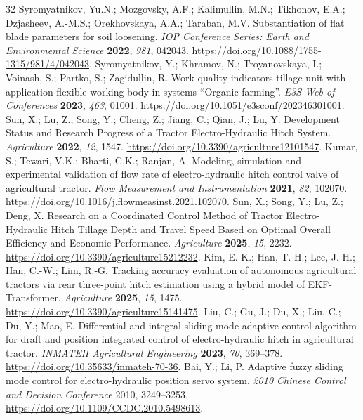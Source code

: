 \documentclass[machines,article,submit,pdftex,moreauthors]{Definitions/mdpi}
\begin{document}
\begin{thebibliography}{32}
 Syromyatnikov, Yu.N.; Mozgovsky, A.F.; Kalimullin, M.N.; Tikhonov, E.A.; Dzjasheev, A.-M.S.; Orekhovskaya, A.A.; Taraban, M.V. Substantiation of flat blade parameters for soil loosening. \emph{IOP Conference Series: Earth and Environmental Science} \textbf{2022}, \emph{981}, 042043. \url{https://doi.org/10.1088/1755-1315/981/4/042043}.
 Syromyatnikov, Y.; Khramov, N.; Troyanovskaya, I.; Voinash, S.; Partko, S.; Zagidullin, R. Work quality indicators tillage unit with application flexible working body in systems ``Organic farming''. \emph{E3S Web of Conferences} \textbf{2023}, \emph{463}, 01001. \url{https://doi.org/10.1051/e3sconf/202346301001}.
 Sun, X.; Lu, Z.; Song, Y.; Cheng, Z.; Jiang, C.; Qian, J.; Lu, Y. Development Status and Research Progress of a Tractor Electro-Hydraulic Hitch System. \emph{Agriculture} \textbf{2022}, \emph{12}, 1547. \url{https://doi.org/10.3390/agriculture12101547}.
 Kumar, S.; Tewari, V.K.; Bharti, C.K.; Ranjan, A. Modeling, simulation and experimental validation of flow rate of electro-hydraulic hitch control valve of agricultural tractor. \emph{Flow Measurement and Instrumentation} \textbf{2021}, \emph{82}, 102070. \url{https://doi.org/10.1016/j.flowmeasinst.2021.102070}.
 Sun, X.; Song, Y.; Lu, Z.; Deng, X. Research on a Coordinated Control Method of Tractor Electro-Hydraulic Hitch Tillage Depth and Travel Speed Based on Optimal Overall Efficiency and Economic Performance. \emph{Agriculture} \textbf{2025}, \emph{15}, 2232. \url{https://doi.org/10.3390/agriculture15212232}.
 Kim, E.-K.; Han, T.-H.; Lee, J.-H.; Han, C.-W.; Lim, R.-G. Tracking accuracy evaluation of autonomous agricultural tractors via rear three-point hitch estimation using a hybrid model of EKF-Transformer. \emph{Agriculture} \textbf{2025}, \emph{15}, 1475. \url{https://doi.org/10.3390/agriculture15141475}.
 Liu, C.; Gu, J.; Du, X.; Liu, C.; Du, Y.; Mao, E. Differential and integral sliding mode adaptive control algorithm for draft and position integrated control of electro-hydraulic hitch in agricultural tractor. \emph{INMATEH Agricultural Engineering} \textbf{2023}, \emph{70}, 369--378. \url{https://doi.org/10.35633/inmateh-70-36}.
 Bai, Y.; Li, P. Adaptive fuzzy sliding mode control for electro-hydraulic position servo system. \emph{2010 Chinese Control and Decision Conference} 2010, 3249--3253. \url{https://doi.org/10.1109/CCDC.2010.5498613}.

\end{thebibliography}
\end{document}
